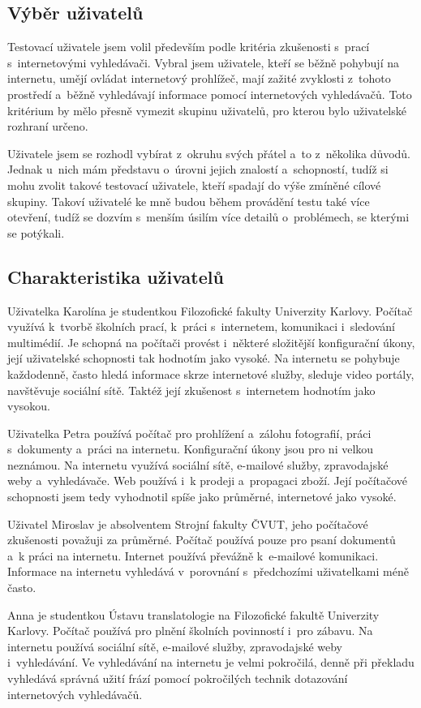 \subsection{Výběr uživatelů}
Testovací uživatele jsem volil především podle kritéria zkušenosti s~prací s~internetovými vyhledávači. Vybral jsem uživatele, kteří se běžně pohybují na internetu, umějí ovládat internetový prohlížeč, mají zažité zvyklosti z~tohoto prostředí a~běžně vyhledávají informace pomocí internetových vyhledávačů. Toto kritérium by mělo přesně vymezit skupinu uživatelů, pro kterou bylo uživatelské rozhraní určeno.

Uživatele jsem se rozhodl vybírat z~okruhu svých přátel a~to z~několika důvodů. Jednak u~nich mám představu o~úrovni jejich znalostí a~schopností, tudíž si mohu zvolit takové testovací uživatele, kteří spadají do výše zmíněné cílové skupiny. Takoví uživatelé ke mně budou během provádění testu také více otevření, tudíž se dozvím s~menším úsilím více detailů o~problémech, se kterými se potýkali.

\subsection{Charakteristika uživatelů}
Uživatelka Karolína je studentkou Filozofické fakulty Univerzity Karlovy. Počítač využívá k~tvorbě školních prací, k~práci s~internetem, komunikaci i~sledování multimédií. Je schopná na počítači provést i~některé složitější konfigurační úkony, její uživatelské schopnosti tak hodnotím jako vysoké. Na internetu se pohybuje každodenně, často hledá informace skrze internetové služby, sleduje video portály, navštěvuje sociální sítě. Taktéž její zkušenost s~internetem hodnotím jako vysokou.

Uživatelka Petra používá počítač pro prohlížení a~zálohu fotografií, práci s~dokumenty a~práci na internetu. Konfigurační úkony jsou pro ni velkou neznámou. Na internetu využívá sociální sítě, e-mailové služby, zpravodajské weby a~vyhledávače. Web používá i~k prodeji a~propagaci zboží. Její počítačové schopnosti jsem tedy vyhodnotil spíše jako průměrné, internetové jako vysoké.

Uživatel Miroslav je absolventem Strojní fakulty ČVUT, jeho počítačové zkušenosti považuji za průměrné. Počítač používá pouze pro psaní dokumentů a~k práci na internetu. Internet používá převážně k~e-mailové komunikaci. Informace na internetu vyhledává v~porovnání s~předchozími uživatelkami méně často.

Anna je studentkou Ústavu translatologie na Filozofické fakultě Univerzity Karlovy. Počítač používá pro plnění školních povinností i~pro zábavu. Na internetu používá sociální sítě, e-mailové služby, zpravodajské weby i~vyhledávání. Ve vyhledávání na internetu je velmi pokročilá, denně při překladu vyhledává správná užití frází pomocí pokročilých technik dotazování internetových vyhledávačů.

